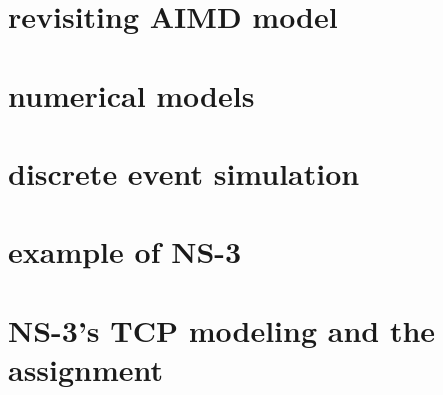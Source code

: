 




\section{revisiting AIMD model}




\section{numerical models}



\section{discrete event simulation}


\section{example of NS-3}


\section{NS-3's TCP modeling and the assignment}



